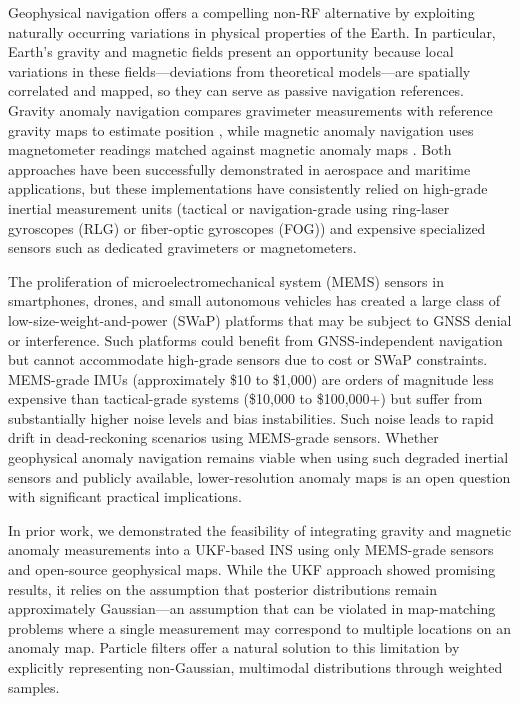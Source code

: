 \documentclass[letterpaper,times]{IONconf}
\begin{document}
Geophysical navigation offers a compelling non-RF alternative by exploiting naturally occurring variations in physical properties of the Earth. In particular, Earth's gravity and magnetic fields present an opportunity because local variations in these fields---deviations from theoretical models---are spatially correlated and mapped, so they can serve as passive navigation references. Gravity anomaly navigation compares gravimeter measurements with reference gravity maps to estimate position \citep{jircitano1991gravity,kamgar1999vehicle,gravnav}, while magnetic anomaly navigation uses magnetometer readings matched against magnetic anomaly maps \citep{tyren1982magnetic,canciani2016absolute,canciani2017airborne,magnav}. Both approaches have been successfully demonstrated in aerospace and maritime applications, but these implementations have consistently relied on high-grade inertial measurement units (tactical or navigation-grade using ring-laser gyroscopes (RLG) or fiber-optic gyroscopes (FOG)) and expensive specialized sensors such as dedicated gravimeters or magnetometers.

The proliferation of microelectromechanical system (MEMS) sensors in smartphones, drones, and small autonomous vehicles has created a large class of low-size-weight-and-power (SWaP) platforms that may be subject to GNSS denial or interference. Such platforms could benefit from GNSS-independent navigation but cannot accommodate high-grade sensors due to cost or SWaP constraints. MEMS-grade IMUs (approximately \$10 to \$1,000) are orders of magnitude less expensive than tactical-grade systems (\$10,000 to \$100,000+) but suffer from substantially higher noise levels and bias instabilities. Such noise leads to rapid drift in dead-reckoning scenarios using MEMS-grade sensors. Whether geophysical anomaly navigation remains viable when using such degraded inertial sensors and publicly available, lower-resolution anomaly maps is an open question with significant practical implications.

In prior work, we demonstrated the feasibility of integrating gravity and magnetic anomaly measurements into a UKF-based INS using only MEMS-grade sensors and open-source geophysical maps. While the UKF approach showed promising results, it relies on the assumption that posterior distributions remain approximately Gaussian---an assumption that can be violated in map-matching problems where a single measurement may correspond to multiple locations on an anomaly map. Particle filters offer a natural solution to this limitation by explicitly representing non-Gaussian, multimodal distributions through weighted samples.
\end{document}
